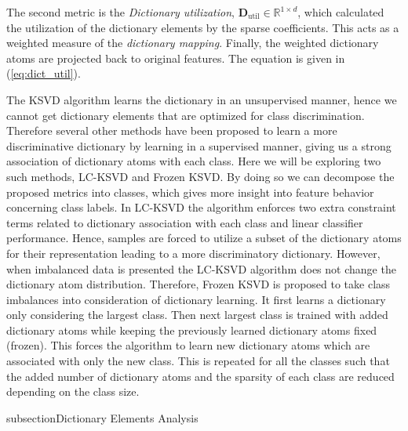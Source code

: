      The second metric is the \emph{Dictionary utilization}, $\mathbf{D}_\textrm{util} \in \mathbb{R}^{1 \times d}$, which calculated the utilization of the dictionary elements by the sparse coefficients. This acts as a weighted measure of the \emph{dictionary mapping}. Finally, the weighted dictionary atoms are projected back to original features. The equation is given in (\ref{eq:dict_util}).
     
     
    The KSVD algorithm learns the dictionary in an unsupervised manner, hence we cannot get dictionary elements that are optimized for class discrimination. Therefore several other methods have been proposed to learn a more discriminative dictionary by learning in a supervised manner, giving us a strong association of dictionary atoms with each class. Here we will be exploring two such methods, LC-KSVD and Frozen KSVD\@. By doing so we can decompose the proposed metrics into classes, which gives more insight into feature behavior concerning class labels. In LC-KSVD the algorithm enforces two extra constraint terms related to dictionary association with each class and linear classifier performance. Hence, samples are forced to utilize a subset of the dictionary atoms for their representation leading to a more discriminatory dictionary. However, when imbalanced data is presented the LC-KSVD algorithm does not change the dictionary atom distribution. Therefore, Frozen KSVD is proposed to take class imbalances into consideration of dictionary learning. It first learns a dictionary only considering the largest class. Then next largest class is trained with added dictionary atoms while keeping the previously learned dictionary atoms fixed (frozen). This forces the algorithm to learn new dictionary atoms which are associated with only the new class. This is repeated for all the classes such that the added number of dictionary atoms and the sparsity of each class are reduced depending on the class size. 

    subsection{Dictionary Elements Analysis}


